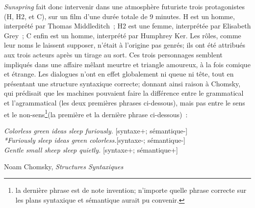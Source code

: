 \documentclass{article}
\newenvironment{citationbox}
{\begin{center}
		\begin{minipage}{.8\textwidth}
		}
		{
		\end{minipage}	
\end{center}
}
\begin{document}
					\textit{Sunspring} fait donc intervenir dans une atmosphère futuriste trois protagonistes (H, H2, et C), sur un film d'une durée totale de 9 minutes. H est un homme, interprété par Thomas Middleditch ; H2 est une femme, interprétée par Elisabeth Grey ; C enfin est un homme, interprété par Humphrey Ker. Les rôles, comme leur noms le laissent supposer, n'était à l'origine pas genrés; ils ont été attribués aux trois acteurs après un tirage au sort. Ces trois personnages semblent impliqués dans une affaire mêlant meurtre et triangle amoureux, à la fois comique et étrange. Les dialogues n'ont en effet globalement ni queue ni tête, tout en présentant une structure syntaxique correcte; donnant ainsi raison à Chomsky, qui prédisait que les machines pouvaient faire la différence entre le grammatical et l'agrammatical (les deux premières phrases ci-dessous), mais pas entre le sens et le non-sens\footnote{la dernière phrase est de note invention; n'importe quelle phrase correcte sur les plans syntaxique et sémantique aurait pu convenir.}(la première et la dernière phrase ci-dessous)~:
					\begin{citationbox}
						\textit{Colorless green ideas sleep furiously.} [syntaxe+; sémantique-]\\
						\textit{*Furiously sleep ideas green colorless.}[syntaxe-; sémantique-]\\
						\textit{Gentle small sheep sleep quietly.} [syntaxe+; sémantique+]
						\begin{flushright}
							Noam Chomsky, \textit{Structures Syntaxiques} \cite{chomsky1979}
						\end{flushright}
					\end{citationbox}
					
\end{document}
